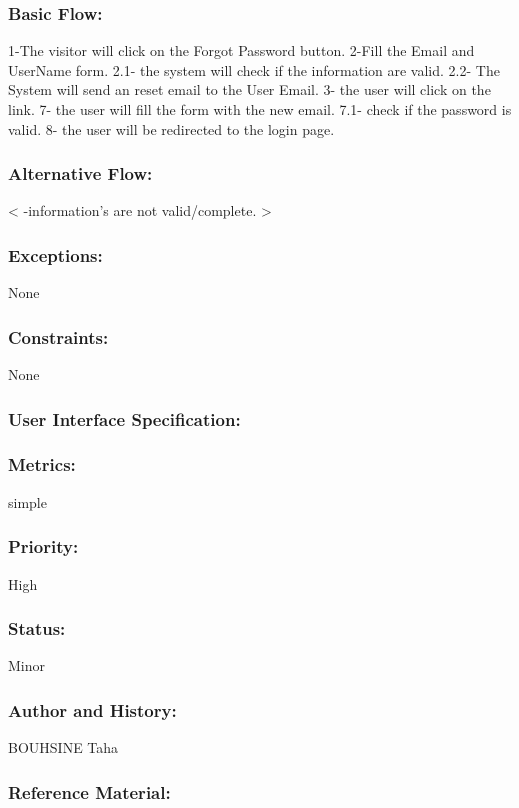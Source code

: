 \documentclass[11pt, openany]{report}
\begin{document}
\subsubsection{Basic Flow:}
1-The visitor will click on the Forgot Password button.
2-Fill the Email and UserName form.
2.1- the system will check if the information are valid.
2.2- The System will send an reset email to the User Email.
3- the user will click on the link.
7- the user will fill the form with the new email.
7.1- check if the password is valid.
8- the user will be redirected to the login page.
\subsubsection{Alternative Flow:}
< -information's are not valid/complete. >
\subsubsection{Exceptions:}
None
\subsubsection{Constraints:}
None
\subsubsection{User Interface Specification:}
\subsubsection{Metrics:}
simple
\subsubsection{Priority:}
High
\subsubsection{Status:}
Minor
\subsubsection{Author and History:}
BOUHSINE Taha
\subsubsection{Reference Material:}
\end{document}

